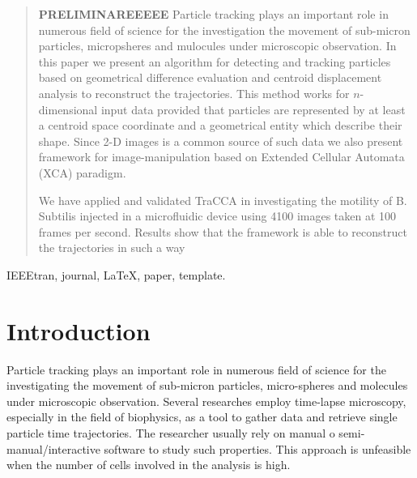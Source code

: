 \documentclass[conference]{IEEEtran}
\begin{document}
\maketitle


\begin{abstract}
\textbf{PRELIMINAREEEEE}
Particle tracking plays an important role in numerous field of science for the investigation the movement of sub-micron particles, micropsheres and mulocules under microscopic observation. In this paper we present an algorithm for detecting and tracking particles based on geometrical difference evaluation and centroid displacement analysis to reconstruct the trajectories. 
This method works for $n$-dimensional input data provided that particles are represented by at least a centroid space coordinate and a geometrical entity which describe their shape. 
Since 2-D images is a common source of such data we also present framework for image-manipulation based on Extended Cellular Automata (XCA) paradigm.

We have applied and validated TraCCA in investigating the motility of B. Subtilis injected in a microfluidic device using 4100 images taken at 100 frames per second. 
Results show that the framework is able to reconstruct the trajectories in such a way 


\end{abstract}

\begin{IEEEkeywords}
IEEEtran, journal, \LaTeX, paper, template.
\end{IEEEkeywords}






%
\IEEEpeerreviewmaketitle

\section{Introduction}
Particle tracking plays an important role in numerous field of science for the investigating the movement of sub-micron particles, micro-spheres and molecules under microscopic observation.  Several researches employ time-lapse microscopy, especially in the field of biophysics, as a tool to gather data and retrieve single particle time trajectories. The researcher usually rely on manual o semi-manual/interactive software to study such properties. This approach is unfeasible when the number of cells involved in the analysis is high.
\end{document}
